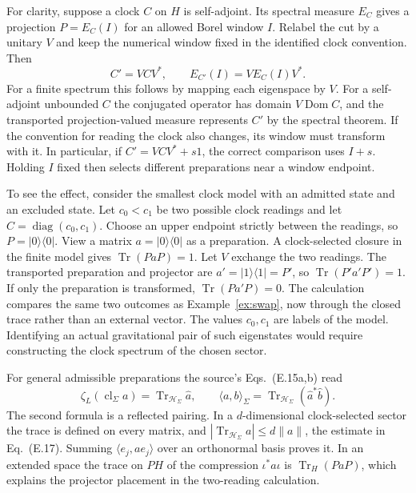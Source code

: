 \documentclass[11pt,letterpaper]{article}
\newcommand{\HH}{\mathcal H}
\newcommand{\tr}{\operatorname{Tr}}
\begin{document}
For clarity, suppose a clock \(C\) on \(H\) is self-adjoint. Its spectral
measure \(E_C\) gives a projection \(P=E_C(I)\) for an allowed Borel
window \(I\). Relabel the cut by a unitary \(V\) and keep the numerical
window fixed in the identified clock convention. Then
\begin{equation}
 C'=VCV^*,\qquad E_{C'}(I)=V E_C(I)V^* .
 \label{eq:spectral-cov}
\end{equation}
For a finite spectrum this follows by mapping each eigenspace by \(V\).
For a self-adjoint unbounded \(C\) the conjugated operator has domain
\(V\operatorname{Dom}C\), and the transported projection-valued measure
represents \(C'\) by the spectral theorem. If the convention for reading
the clock also changes, its window must transform with it.
In particular, if \(C'=VCV^*+s1\), the correct comparison uses \(I+s\).
Holding \(I\) fixed then selects different preparations near a window
endpoint.

To see the effect, consider the smallest clock model with an admitted
state and an excluded state. Let \(c_0<c_1\) be two possible clock
readings and let \(C=\operatorname{diag}(c_0,c_1)\).
Choose an upper endpoint strictly between the readings, so
\(P=|0\rangle\langle0|\). View a matrix
\(a=|0\rangle\langle0|\) as a preparation. A clock-selected closure in
the finite model gives
\(\tr(PaP)=1\). Let \(V\) exchange the two readings. The transported
preparation and projector are \(a'=|1\rangle\langle1|=P'\), so
\(\tr(P'a'P')=1\). If only the preparation is transformed,
\(\tr(Pa'P)=0\). The calculation compares the same two outcomes as
Example~\ref{ex:swap}, now through the closed trace rather than an
external vector. The values \(c_0,c_1\) are labels of the model.
Identifying an actual gravitational pair of such eigenstates would require
constructing the clock spectrum of the chosen sector.

For general admissible preparations the source's Eqs.~(E.15a,b) read
\[
 \zeta_L(\operatorname{cl}_\Sigma a)=\tr_{\HH_\Sigma}\widehat a,
 \qquad
 \langle a,b\rangle_\Sigma
    =\tr_{\HH_\Sigma}(\widehat a^*\widehat b).
\]
The second formula is a reflected pairing. In a \(d\)-dimensional
clock-selected sector the trace is defined on every matrix, and
\(|\tr_{\HH_\Sigma} a|\le d\|a\|\), the estimate in Eq.~(E.17).
Summing \(\langle e_j,a e_j\rangle\) over an orthonormal basis proves it.
In an extended space the trace on \(PH\) of the compression
\(\iota^*a\iota\) is \(\tr_H(PaP)\), which explains the projector
placement in the two-reading calculation.
\end{document}
